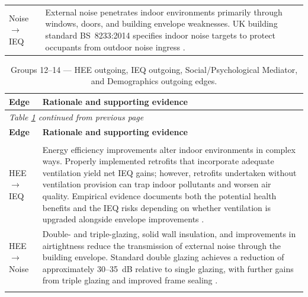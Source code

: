 \begin{longtable}{@{}p{3.8cm}p{11.2cm}@{}}
\addlinespace
Noise $\to$ IEQ & External noise penetrates indoor environments primarily through windows, doors, and building envelope weaknesses. UK building standard BS~8233:2014 specifies indoor noise targets to protect occupants from outdoor noise ingress \citep{british_standards_institution_bs_2014, world_health_organization_environmental_2018}. \\
\end{longtable}


\begin{longtable}{@{}p{3.8cm}p{11.2cm}@{}}
\caption{Groups 12--14 --- HEE outgoing, IEQ outgoing, Social/Psychological Mediator, and Demographics outgoing edges.}
\label{tab:edges-social}\\
\toprule
\textbf{Edge} & \textbf{Rationale and supporting evidence} \\
\midrule
\endfirsthead
\multicolumn{2}{l}{\textit{Table \ref{tab:edges-social} continued from previous page}}\\
\toprule
\textbf{Edge} & \textbf{Rationale and supporting evidence} \\
\midrule
\endhead
\bottomrule
\endfoot
\multicolumn{2}{@{}l}{\textit{HEE outgoing edges}}\\
\addlinespace
HEE $\to$ IEQ
& Energy efficiency improvements alter indoor environments in complex ways. Properly implemented retrofits that incorporate adequate ventilation yield net IEQ gains; however, retrofits undertaken without ventilation provision can trap indoor pollutants and worsen air quality. Empirical evidence documents both the potential health benefits and the IEQ risks depending on whether ventilation is upgraded alongside envelope improvements \citep{hamilton_health_2015, shrubsole_100_2014, fisk_association_2020, poortinga_health_2018}. \\
\addlinespace
HEE $\to$ Noise
& Double- and triple-glazing, solid wall insulation, and improvements in airtightness reduce the transmission of external noise through the building envelope. Standard double glazing achieves a reduction of approximately 30--35~dB relative to single glazing, with further gains from triple glazing and improved frame sealing \citep{tong_full-scale_2015, hongisto_satisfaction_2015}. \\
\addlinespace
\multicolumn{2}{@{}l}{\textit{IEQ outgoing edges}}\\

\end{longtable}
